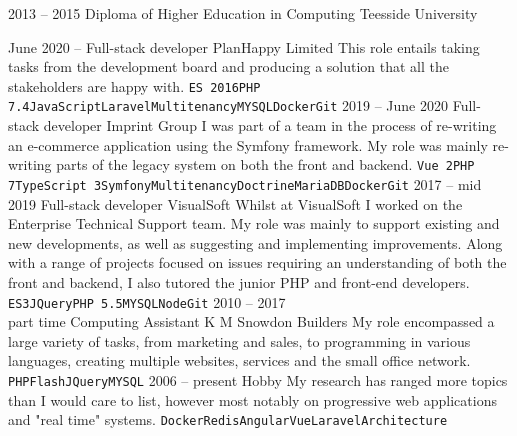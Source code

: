 \documentclass[9pt]{developercv} %
\begin{document}
\vspace{10mm}



\begin{entrylist}
  \entry
  {2013 -- 2015}
  {Diploma of Higher Education in Computing}
  {Teesside University}
  {}
\end{entrylist}



\begin{entrylist}
  \entry
  {June 2020 -- }
  {Full-stack developer}
  {PlanHappy Limited}
  {
    This role entails taking tasks from the development board and producing a solution that all the stakeholders are happy with.
    \texttt{ES 2016}\slashsep\texttt{PHP 7.4}\slashsep\texttt{JavaScript}\slashsep\texttt{Laravel}\slashsep\texttt{Multitenancy}\slashsep\texttt{MYSQL}\slashsep\texttt{Docker}\slashsep\texttt{Git}
  }
  \entry
  {2019 -- June 2020}
  {Full-stack developer}
  {Imprint Group}
  {
    I was part of a team in the process of re-writing an e-commerce application using the Symfony framework. My role was mainly re-writing parts of the legacy system on both the front and backend.
    \texttt{Vue 2}\slashsep\texttt{PHP 7}\slashsep\texttt{TypeScript 3}\slashsep\texttt{Symfony}\slashsep\texttt{Multitenancy}\slashsep\texttt{Doctrine}\slashsep\texttt{MariaDB}\slashsep\texttt{Docker}\slashsep\texttt{Git}
  }
  \entry
  {2017 -- mid 2019}
  {Full-stack developer}
  {VisualSoft}
  {
    Whilst at VisualSoft I worked on the Enterprise Technical Support team. My role was mainly to support existing and new developments, as well as suggesting and implementing improvements. Along with a range of projects focused on issues requiring an understanding of both the front and backend, I also tutored the junior PHP and front-end developers.
    \texttt{ES3}\slashsep\texttt{JQuery}\slashsep\texttt{PHP 5.5}\slashsep\texttt{MYSQL}\slashsep\texttt{Node}\slashsep\texttt{Git}}
  \entry
  {2010 -- 2017\\\footnotesize{part time}}
  {Computing Assistant}
  { K M Snowdon Builders}
  {
    My role encompassed a large variety of tasks, from marketing and sales, to programming in various languages, creating multiple websites, services and the small office network.
    \texttt{PHP}\slashsep\texttt{Flash}\slashsep\texttt{JQuery}\slashsep\texttt{MYSQL}
    }
    \entry
    {2006 -- present}
    {Hobby}
    {}
    {
      My research has ranged more topics than I would care to list, however most notably on progressive web applications and "real time" systems. 
      \texttt{Docker}\slashsep\texttt{Redis}\slashsep\texttt{Angular}\slashsep\texttt{Vue}\slashsep\texttt{Laravel}\slashsep\texttt{Architecture}
      }
\end{entrylist}
\end{document}
